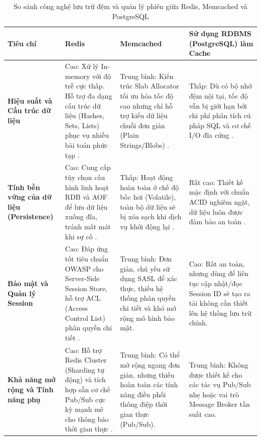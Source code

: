 \clearpage
\begin{landscape}
\begin{table}[h!]
\centering
\setlength{\tabcolsep}{4pt}
\footnotesize
\renewcommand{\arraystretch}{1.4}
\begin{tabularx}{\linewidth}{|l|X|X|X|}
\hline
\textbf{Tiêu chí} & \textbf{Redis} & \textbf{Memcached} & \textbf{Sử dụng RDBMS (PostgreSQL) làm Cache} \\
\hline
\textbf{Hiệu suất và Cấu trúc dữ liệu} & 
Cao: Xử lý In-memory với độ trễ cực thấp. Hỗ trợ đa dạng cấu trúc dữ liệu (Hashes, Sets, Lists) phục vụ nhiều bài toán phức tạp \cite{redis_docs}. & 
Trung bình: Kiến trúc Slab Allocator tối ưu hóa tốc độ cao nhưng chỉ hỗ trợ kiểu dữ liệu chuỗi đơn giản (Plain Strings/Blobs) \cite{memcached_docs}. & 
Thấp: Dù có bộ nhớ đệm nội tại, tốc độ vẫn bị giới hạn bởi chi phí phân tích cú pháp SQL và cơ chế I/O đĩa cứng \cite{postgres17_manual}. \\
\hline
\textbf{Tính bền vững của dữ liệu (Persistence)} & 
Cao: Cung cấp tùy chọn cấu hình linh hoạt RDB và AOF để lưu dữ liệu xuống đĩa, tránh mất mát khi sự cố \cite{redis_persistence}. & 
Thấp: Hoạt động hoàn toàn ở chế độ bốc hơi (Volatile), toàn bộ dữ liệu sẽ bị xóa sạch khi dịch vụ khởi động lại \cite{memcached_docs}. & 
Rất cao: Thiết kế mặc định với chuẩn ACID nghiêm ngặt, dữ liệu luôn được đảm bảo an toàn \cite{postgres17_manual}. \\
\hline
\textbf{Bảo mật và Quản lý Session} & 
Cao: Đáp ứng tốt tiêu chuẩn OWASP cho Server-Side Session Store, hỗ trợ ACL (Access Control List) phân quyền chi tiết \cite{owasp_session}. & 
Trung bình: Đơn giản, chủ yếu sử dụng SASL để xác thực, thiếu hệ thống phân quyền chi tiết và khó mở rộng mô hình bảo mật. & 
Cao: Rất an toàn, nhưng dùng để liên tục cập nhật/đọc Session ID sẽ tạo ra tải không cần thiết lên hệ thống lưu trữ chính. \\
\hline
\textbf{Khả năng mở rộng và Tính năng phụ} & 
Cao: Hỗ trợ Redis Cluster (Sharding tự động) và tích hợp sẵn cơ chế Pub/Sub cực kỳ mạnh mẽ cho thông báo thời gian thực \cite{redis_pubsub}. & 
Trung bình: Có thể mở rộng ngang đơn giản, nhưng thiếu hoàn toàn các tính năng điều phối thông điệp thời gian thực (Pub/Sub). & 
Trung bình: Không được thiết kế cho các tác vụ Pub/Sub nhẹ hoặc vai trò Message Broker tần suất cao. \\
\hline
\end{tabularx}
\caption{So sánh công nghệ lưu trữ đệm và quản lý phiên giữa Redis, Memcached và PostgreSQL}
\end{table}
\end{landscape}